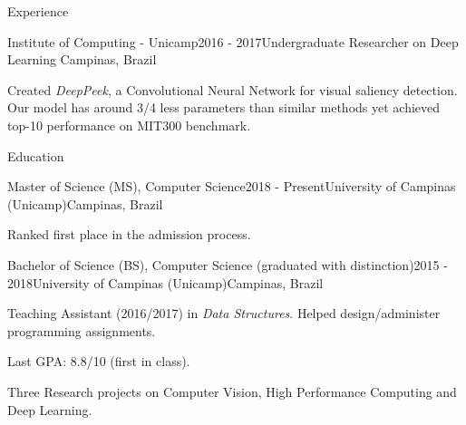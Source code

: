 \documentclass[8pt]{resume}
\newcommand{\tit}[1]{\textit{#1}}
\begin{document}
\begin{rSection}{Experience}
\begin{rSubsection}{Institute of Computing - Unicamp}{2016 - 2017}{Undergraduate Researcher on Deep Learning}
    {Campinas, Brazil}
    \item Created \tit{DeepPeek}, a Convolutional Neural Network for visual saliency detection.
        Our model has around 3/4 less parameters than similar methods yet
        achieved top-10 performance on MIT300 benchmark.
\end{rSubsection}
\end{rSection}

\begin{rSection}{Education}
\begin{rSubsection}{Master of Science (MS), Computer Science}{2018 - Present}{University of Campinas (Unicamp)}{Campinas, Brazil}
    \item Ranked first place in the admission process.
\end{rSubsection}

\begin{rSubsection}{Bachelor of Science (BS), Computer Science (graduated with distinction)}{2015 - 2018}{University of Campinas (Unicamp)}{Campinas, Brazil}
    \item Teaching Assistant (2016/2017) in \tit{Data Structures}. Helped
        design/administer programming assignments.
    \item Last GPA: 8.8/10 (first in class).
    \item Three Research projects on Computer Vision, High Performance Computing and Deep Learning.
\end{rSubsection}
\end{rSection}
\end{document}

